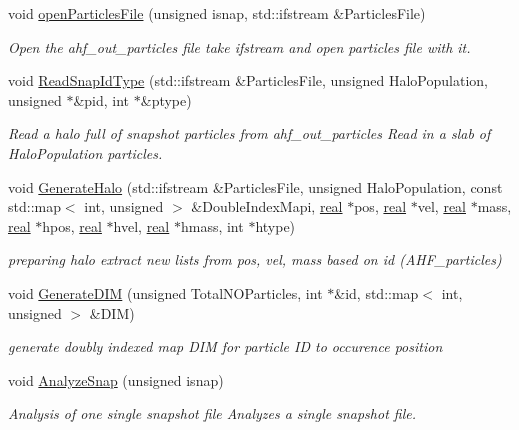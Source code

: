 \begin{DoxyCompactItemize}
void \hyperlink{AnalyzeSnap_8cpp_a07f732b0c1b2b63a40dd8ae52850f50b}{openParticlesFile} (unsigned isnap, std::ifstream \&ParticlesFile)
\begin{DoxyCompactList}\small\item\em Open the ahf\_\-out\_\-particles file take ifstream and open particles file with it. \item\end{DoxyCompactList}\item 
void \hyperlink{AnalyzeSnap_8cpp_a4c813ec7d70ddf16a008d578b587b2e4}{ReadSnapIdType} (std::ifstream \&ParticlesFile, unsigned HaloPopulation, unsigned $\ast$\&pid, int $\ast$\&ptype)
\begin{DoxyCompactList}\small\item\em Read a halo full of snapshot particles from ahf\_\-out\_\-particles Read in a slab of HaloPopulation particles. \item\end{DoxyCompactList}\item 
void \hyperlink{AnalyzeSnap_8cpp_ab9fb580fd4661772d21457471910d0c1}{GenerateHalo} (std::ifstream \&ParticlesFile, unsigned HaloPopulation, const std::map$<$ int, unsigned $>$ \&DoubleIndexMapi, \hyperlink{Global_8h_a031f8951175b43076c2084a6c2173410}{real} $\ast$pos, \hyperlink{Global_8h_a031f8951175b43076c2084a6c2173410}{real} $\ast$vel, \hyperlink{Global_8h_a031f8951175b43076c2084a6c2173410}{real} $\ast$mass, \hyperlink{Global_8h_a031f8951175b43076c2084a6c2173410}{real} $\ast$hpos, \hyperlink{Global_8h_a031f8951175b43076c2084a6c2173410}{real} $\ast$hvel, \hyperlink{Global_8h_a031f8951175b43076c2084a6c2173410}{real} $\ast$hmass, int $\ast$htype)
\begin{DoxyCompactList}\small\item\em preparing halo extract new lists from pos, vel, mass based on id (AHF\_\-particles) \item\end{DoxyCompactList}\item 
void \hyperlink{AnalyzeSnap_8cpp_acfcefc58f51f28a6592e2f50e067881a}{GenerateDIM} (unsigned TotalNOParticles, int $\ast$\&id, std::map$<$ int, unsigned $>$ \&DIM)
\begin{DoxyCompactList}\small\item\em generate doubly indexed map DIM for particle ID to occurence position \item\end{DoxyCompactList}\item 
void \hyperlink{AnalyzeSnap_8cpp_adeb9f0fc17baa68b04ea3e4f96764400}{AnalyzeSnap} (unsigned isnap)
\begin{DoxyCompactList}\small\item\em Analysis of one single snapshot file Analyzes a single snapshot file. \item\end{DoxyCompactList}\end{DoxyCompactItemize}
